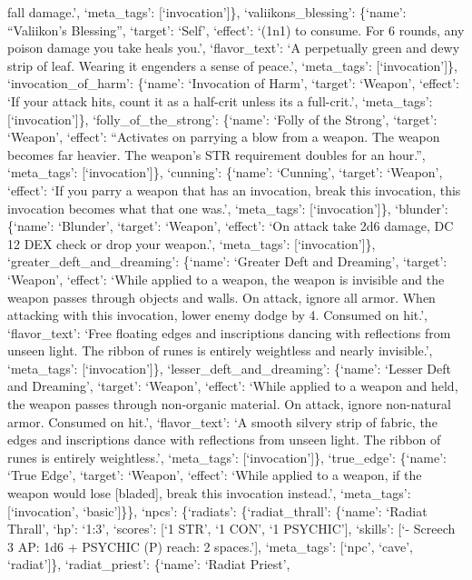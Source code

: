 \documentclass[
  letterpaper,
  DIV=11,
  numbers=noendperiod]{scrartcl}
\begin{document}
fall damage.', `meta\_tags': {[}`invocation'{]}\},
`valiikons\_blessing': \{`name': ``Valiikon's Blessing'', `target':
`Self', `effect': `(1n1) to consume. For 6 rounds, any poison damage you
take heals you.', `flavor\_text': `A perpetually green and dewy strip of
leaf. Wearing it engenders a sense of peace.', `meta\_tags':
{[}`invocation'{]}\}, `invocation\_of\_harm': \{`name': `Invocation of
Harm', `target': `Weapon', `effect': `If your attack hits, count it as a
half-crit unless its a full-crit.', `meta\_tags': {[}`invocation'{]}\},
`folly\_of\_the\_strong': \{`name': `Folly of the Strong', `target':
`Weapon', `effect': ``Activates on parrying a blow from a weapon. The
weapon becomes far heavier. The weapon's STR requirement doubles for an
hour.'', `meta\_tags': {[}`invocation'{]}\}, `cunning': \{`name':
`Cunning', `target': `Weapon', `effect': `If you parry a weapon that has
an invocation, break this invocation, this invocation becomes what that
one was.', `meta\_tags': {[}`invocation'{]}\}, `blunder': \{`name':
`Blunder', `target': `Weapon', `effect': `On attack take 2d6 damage, DC
12 DEX check or drop your weapon.', `meta\_tags': {[}`invocation'{]}\},
`greater\_deft\_and\_dreaming': \{`name': `Greater Deft and Dreaming',
`target': `Weapon', `effect': `While applied to a weapon, the weapon is
invisible and the weapon passes through objects and walls. On attack,
ignore all armor. When attacking with this invocation, lower enemy dodge
by 4. Consumed on hit.', `flavor\_text': `Free floating edges and
inscriptions dancing with reflections from unseen light. The ribbon of
runes is entirely weightless and nearly invisible.', `meta\_tags':
{[}`invocation'{]}\}, `lesser\_deft\_and\_dreaming': \{`name': `Lesser
Deft and Dreaming', `target': `Weapon', `effect': `While applied to a
weapon and held, the weapon passes through non-organic material. On
attack, ignore non-natural armor. Consumed on hit.', `flavor\_text': `A
smooth silvery strip of fabric, the edges and inscriptions dance with
reflections from unseen light. The ribbon of runes is entirely
weightless.', `meta\_tags': {[}`invocation'{]}\}, `true\_edge':
\{`name': `True Edge', `target': `Weapon', `effect': `While applied to a
weapon, if the weapon would lose {[}bladed{]}, break this invocation
instead.', `meta\_tags': {[}`invocation', `basic'{]}\}\}, `npcs':
\{`radiats': \{`radiat\_thrall': \{`name': `Radiat Thrall', `hp': `1:3',
`scores': {[}`1 STR', `1 CON', `1 PSYCHIC'{]}, `skills': {[}`- Screech 3
AP: 1d6 + PSYCHIC (P) reach: 2 spaces.'{]}, `meta\_tags': {[}`npc',
`cave', `radiat'{]}\}, `radiat\_priest': \{`name': `Radiat Priest',
\end{document}
